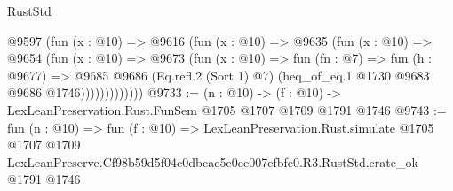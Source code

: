 \begin{lexlean}{RustStd}
\begin{coremodule}
                @9597
                  (fun (x : @10) =>
                  @9616
                    (fun (x : @10) =>
                    @9635
                      (fun (x : @10) =>
                      @9654
                        (fun (x : @10) =>
                        @9673
                          (fun (x : @10) =>
                          fun (fn : @7) =>
                          fun (h : @9677) =>
                          @9685
                            @9686
                            (Eq.refl.{2} (Sort 1) @7)
                            (heq_of_eq.{1} @1730 @9683 @9686 @1746)))))))))))))
@9733 := (n : @10) -> (f : @10) -> LexLeanPreservation.Rust.FunSem @1705 @1707 @1709 @1791 @1746
@9743 := fun (n : @10) =>
  fun (f : @10) =>
  LexLeanPreservation.Rust.simulate
    @1705
    @1707
    @1709
    LexLeanPreserve.Cf98b59d5f04c0dbcac5e0ee007efbfe0.R3.RustStd.crate_ok
    @1791
    @1746
\end{coremodule}
\end{lexlean}
